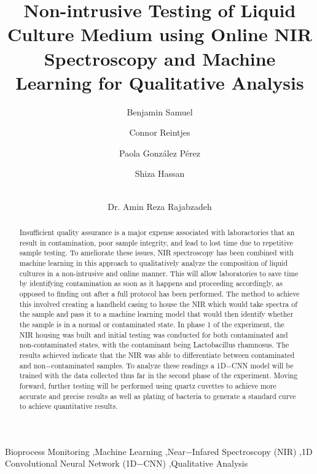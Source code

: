 \documentclass[preprint, 3p, 11pt]{elsarticle}
\begin{document}
\begin{frontmatter}


\title{Non-intrusive Testing of Liquid Culture Medium using Online NIR Spectroscopy and Machine Learning for Qualitative Analysis}

\author[1]{Benjamin Samuel}
\author[1]{Connor Reintjes}
\author[1]{Paola Gonz\'alez P\'erez}
\author[1]{Shiza Hassan}
\author[1]{\\Dr. Amin Reza Rajabzadeh} %



\begin{abstract}
Insufficient quality assurance is a major expense associated with laboractories that an result in contamination, poor sample integrity, and lead to lost time due to repetitive sample testing. To ameliorate these issues, NIR spectroscopy has been combined with machine learning in this approach to qualitatively analyze the composition of liquid cultures in a non-intrusive and online manner. This will allow laboratories to save time by identifying contamination as soon as it happens and proceeding accordingly, as opposed to finding out after a full protocol has been performed. The method to achieve this involved creating a handheld casing to house the NIR which would take spectra of the sample and pass it to a machine learning model that would then identify whether the sample is in a normal or contaminated state. In phase 1 of the experiment, the NIR housing was built and initial testing was conducted for both contaminated and non-contaminated states, with the contaminant being Lactobacillus rhamnosus. The results achieved indicate that the NIR was able to differentiate between contaminated and non$-$contaminated samples. To analyze these readings a 1D$-$CNN model will be trained with the data collected thus far in the second phase of the experiment. Moving forward, further testing will be performed using quartz cuvettes to achieve more accurate and precise results as well as plating of bacteria to generate a standard curve to achieve quantitative results. 

\end{abstract}

\begin{keyword}
Bioprocess Monitoring \sep Machine Learning \sep Near$-$Infared Spectroscopy (NIR) \sep 1D Convolutional Neural Network (1D$-$CNN) \sep Qualitative Analysis
\end{keyword}

\end{frontmatter}
\end{document}
